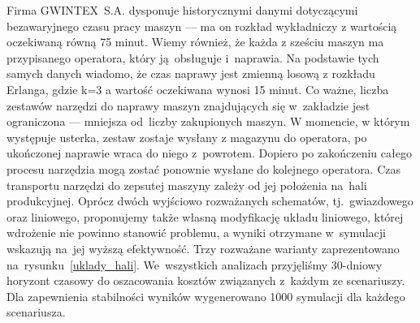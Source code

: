 \documentclass[12pt, a4paper, oneside]{mwart} %
\begin{document}
Firma GWINTEX~S.A. dysponuje historycznymi danymi dotyczącymi bezawaryjnego czasu pracy maszyn --- ma on rozkład wykładniczy z wartością oczekiwaną równą 75 minut. Wiemy również, że każda z sześciu maszyn ma przypisanego operatora, który ją~obsługuje i~naprawia. Na podstawie tych samych danych wiadomo, że czas naprawy jest zmienną losową z rozkładu Erlanga, gdzie k=3 a wartość oczekiwana wynosi 15 minut. Co ważne, liczba zestawów narzędzi do naprawy maszyn znajdujących się w~zakładzie jest ograniczona --- mniejsza od~liczby zakupionych maszyn. W momencie, w którym występuje usterka, zestaw zostaje wysłany z magazynu do operatora, po ukończonej naprawie wraca do niego z~powrotem. Dopiero po zakończeniu całego procesu narzędzia mogą zostać ponownie wysłane do kolejnego operatora. Czas transportu narzędzi do zepsutej maszyny zależy od jej położenia na~hali produkcyjnej. Oprócz dwóch wyjściowo rozważanych schematów, tj.~gwiazdowego oraz liniowego, proponujemy także własną modyfikację układu liniowego, której wdrożenie nie powinno stanowić problemu, a wyniki otrzymane w~symulacji wskazują na~jej wyższą efektywność. Trzy rozważane warianty zaprezentowano na~rysunku~\ref{uklady_hali}. We~wszystkich analizach przyjęliśmy 30-dniowy horyzont czasowy do oszacowania kosztów związanych z~każdym ze scenariuszy. Dla zapewnienia stabilności wyników wygenerowano 1000 symulacji dla każdego scenariusza.
\end{document}
